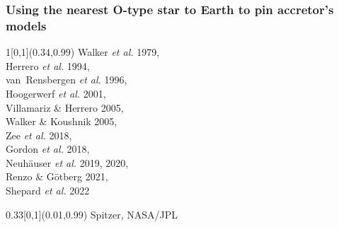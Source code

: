 \documentclass[xcolor=dvipsnames,professionalfonts, aspectratio=169]{beamer}
\begin{document}
\bgroup
{}
\begin{frame}
  \frametitle{\textcolor{whiteish}{Using the nearest O-type star to
      Earth to pin accretor's models}}

  \begin{textblock}{1}[0,1](0.34,0.99)
    \textcolor{gray!50}{\tiny
      Walker \emph{et al.} 1979,\\
      Herrero \emph{et al.} 1994,\\
      van~Rensbergen \emph{et al.} 1996,\\
      Hoogerwerf \emph{et al.} 2001,\\
      Villamariz \& Herrero 2005,\\
      Walker \& Koushnik 2005,\\
      Zee \emph{et al.} 2018,\\
      Gordon \emph{et al.} 2018,\\
      Neuh\"auser \emph{et al.} 2019, 2020,\\
      Renzo \& G\"otberg 2021,\\[-7pt]
      Shepard \emph{et al.} 2022
    }
  \end{textblock}

  \begin{textblock}{0.33}[0,1](0.01,0.99)
    \textcolor{gray!50}{\tiny Spitzer, NASA/JPL}
  \end{textblock}






\end{frame}
\end{document}
